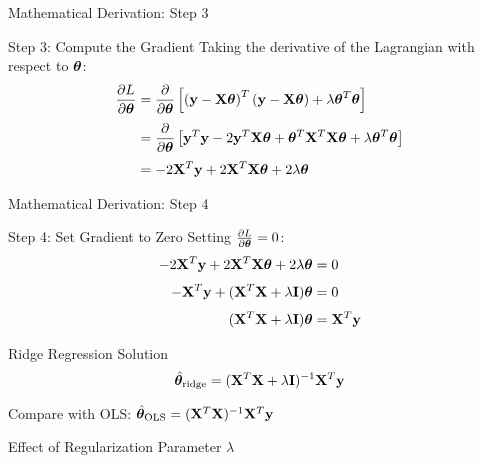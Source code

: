 \documentclass{beamer}
\begin{document}
\begin{frame}{Mathematical Derivation: Step 3}
\begin{codebox}{Step 3: Compute the Gradient}
Taking the derivative of the Lagrangian with respect to $\boldsymbol{\theta}$:
\begin{align}
\frac{\partial L}{\partial \boldsymbol{\theta}} &= \frac{\partial}{\partial \boldsymbol{\theta}}\left[\left(\mathbf{y}-\mathbf{X}\boldsymbol{\theta}\right)^T\left(\mathbf{y}-\mathbf{X}\boldsymbol{\theta}\right) + \lambda \boldsymbol{\theta}^T\boldsymbol{\theta}\right] \\[0.3em]
&= \frac{\partial}{\partial \boldsymbol{\theta}}\left[\mathbf{y}^T\mathbf{y} - 2\mathbf{y}^T\mathbf{X}\boldsymbol{\theta} + \boldsymbol{\theta}^T\mathbf{X}^T\mathbf{X}\boldsymbol{\theta} + \lambda \boldsymbol{\theta}^T\boldsymbol{\theta}\right] \\[0.3em]
&= -2\mathbf{X}^T\mathbf{y} + 2\mathbf{X}^T\mathbf{X}\boldsymbol{\theta} + 2\lambda\boldsymbol{\theta}
\end{align}
\end{codebox}
\end{frame}

\begin{frame}{Mathematical Derivation: Step 4}
\begin{codebox}{Step 4: Set Gradient to Zero}
Setting $\frac{\partial L}{\partial \boldsymbol{\theta}} = 0$:
\begin{align}
-2\mathbf{X}^T\mathbf{y} + 2\mathbf{X}^T\mathbf{X}\boldsymbol{\theta} + 2\lambda\boldsymbol{\theta} &= 0 \\[0.3em]
-\mathbf{X}^T\mathbf{y} + (\mathbf{X}^T\mathbf{X} + \lambda\mathbf{I})\boldsymbol{\theta} &= 0 \\[0.3em]
(\mathbf{X}^T\mathbf{X} + \lambda\mathbf{I})\boldsymbol{\theta} &= \mathbf{X}^T\mathbf{y}
\end{align}
\end{codebox}
\pause

\begin{theorembox}{Ridge Regression Solution}
$$\hat{\boldsymbol{\theta}}_{\text{ridge}} = (\mathbf{X}^T\mathbf{X} + \lambda\mathbf{I})^{-1}\mathbf{X}^T\mathbf{y}$$
\end{theorembox}

Compare with OLS: $\hat{\boldsymbol{\theta}}_{\text{OLS}} = (\mathbf{X}^T\mathbf{X})^{-1}\mathbf{X}^T\mathbf{y}$
\end{frame}

\begin{frame}{Effect of Regularization Parameter $\lambda$}
\vspace{0.4cm}
\end{frame}
\end{document}
